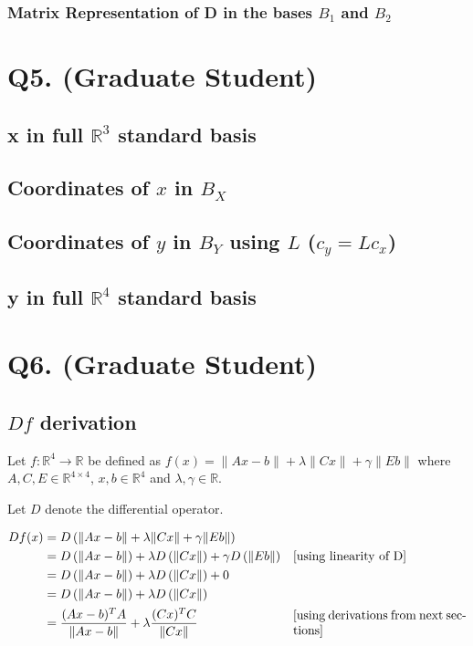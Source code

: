 \documentclass{article}
\begin{document}
    \subsubsection{Matrix Representation of D in the bases $B_1$ and $B_2$}

    \section{Q5. (Graduate Student)}

    \subsection{x in full $\mathbb{R}^3$ standard basis}
    \subsection{Coordinates of $x$ in $B_X$}
    \subsection{Coordinates of $y$ in $B_Y$ using $L$ ($c_y = Lc_x$)}
    \subsection{y in full $\mathbb{R}^4$ standard basis}


    \section{Q6. (Graduate Student)}
    \subsection{ $Df$ derivation }
    Let $f: \mathbb{R}^4 \rightarrow \mathbb{R}$ be defined as $f(x) = \| Ax - b \| + \lambda \| Cx \| + \gamma \| Eb \|$ where $A, C, E \in \mathbb{R}^{4 \times 4}$, $x,b \in \mathbb{R}^4$ and $\lambda,\gamma \in \mathbb{R}$.

    Let $D$ denote the differential operator.

    \begin{align*}
    Df(x) &= D \left( \| Ax - b \| + \lambda \| Cx \| + \gamma \| Eb \| \right) &\\
    &= D \left( \| Ax - b \| \right) +  \lambda D \left( \| Cx \| \right) +  \gamma D \left( \| Eb \| \right) & \parbox[c]{0.4\linewidth}{[using linearity of D]}\\
    &= D \left( \| Ax - b \| \right) +  \lambda D \left( \| Cx \| \right) +  0 &\\
    &= D \left( \| Ax - b \| \right) +  \lambda D \left( \| Cx \| \right) &\\
    &= \frac{ (Ax-b)^T A }{\| Ax-b \| } + \lambda \frac{(Cx)^T C}{ \| Cx \| } & \parbox[c]{0.4\linewidth}{[using derivations from next sections]}
    \end{align*}
\end{document}
